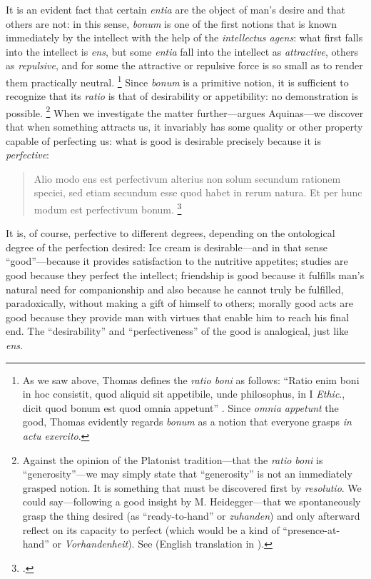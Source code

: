 It is an evident fact that certain \emph{entia} are the object of man’s desire and that others are not: in this sense, \emph{bonum} is one of the first notions that is known immediately by the intellect with the help of the \emph{intellectus agens}: what first falls into the intellect is \emph{ens}, but some \emph{entia} fall into the intellect as \emph{attractive}, others as \emph{repulsive}, and for some the attractive or repulsive force is so small as to render them practically neutral.%
%
\footnote{As we saw above, Thomas defines the \emph{ratio boni} as follows: “Ratio enim boni in hoc consistit, quod aliquid sit appetibile, unde philosophus, in I \emph{Ethic}., dicit quod bonum est quod omnia appetunt” \parencite[I, q.~5, a.~1, co.]{st:summa}. Since \emph{omnia appetunt} the good, Thomas evidently regards \emph{bonum} as a notion that everyone grasps \emph{in actu exercito}.}
%
Since \emph{bonum} is a primitive notion, it is sufficient to recognize that its \emph{ratio} is that of desirability or appetibility: no demonstration is possible.%
%
\footnote{Against the opinion of the Platonist tradition—that the \emph{ratio boni} is “generosity”—we may simply state that “generosity” is not an immediately grasped notion. It is something that must be discovered first by \emph{resolutio}. We could say—following a good insight by M. Heidegger—that we spontaneously grasp the thing desired (as “ready-to-hand” or \emph{zuhanden}) and only afterward reflect on its capacity to perfect (which would be a kind of “presence-at-hand” or \emph{Vorhandenheit}). See \cite[42 and 69]{heidegger:being} (English translation in \cite[67 and 98]{heidegger:being:en}).}
%
When we investigate the matter further—argues Aquinas—we discover that when something attracts us, it invariably has some quality or other property capable of perfecting us: what is good is desirable precisely because it is \emph{perfective}:%
%
\begin{quotation}
Alio modo ens est perfectivum alterius non solum secundum rationem speciei, sed etiam secundum esse quod habet in rerum natura. Et per hunc modum est perfectivum bonum.%
%
\footcite[q.~21, a.~1, co.]{st:deveritate}
%
\end{quotation}%
%
It is, of course, perfective to different degrees, depending on the ontological degree of the perfection desired: Ice cream is desirable—and in that sense “good”—because it provides satisfaction to the nutritive appetites; studies are good because they perfect the intellect; friendship is good because it fulfills man’s natural need for companionship and also because he cannot truly be fulfilled, paradoxically, without making a gift of himself to others; morally good acts are good because they provide man with virtues that enable him to reach his final end. The “desirability” and “perfectiveness” of the good is analogical, just like \emph{ens}.

